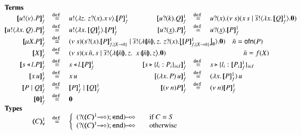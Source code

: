 \begin{figure}[h!]
\[
	\begin{array}{rclcrcl}
		\multicolumn{7}{l}{\textrm{\bf Terms}}
		\\
		\pmapp{\bout{u}{v} P}{1}{f}	&\defeq&	\bout{u}{ \abs{z}{\,\binp{z}{x} \appl{x}{v}} } \pmapp{P}{1}{f}
		& &
		\pmapp{\binp{u}{k} Q}{1}{f}	&\defeq&	\binp{u}{x} \newsp{s}{\appl{x}{s} \Par \bout{\dual{s}}{\abs{x}{\pmapp{Q}{1}{f}}} \inact}
		\\
		\pmapp{\bout{u}{\abs{x}{Q}} P}{1}{f} &\defeq& \bout{u}{\abs{x}{\pmapp{Q}{1}{f}}} \pmapp{P}{1}{f}
		& &
		\pmapp{\binp{u}{\underline{x}} P}{1}{f}	&\defeq&	\binp{u}{\underline{x}} \pmapp{P}{1}{f}
		\\
		\pmapp{\recp{X}{P}}{1}{f} &\defeq&
		\multicolumn{5}{l}{
			\newsp{s}{\binp{s}{x} \pmapp{P}{1}{{f,\{\varp{X}\to \tilde{n}\}}} \Par
			\bout{\dual{s}}{\abs{\vmap{\tilde{n}}, z } \,{\binp{z}{x} \auxmap{\pmapp{P}{1}{{f,\{\varp{X}\to \tilde{n}\}}}}{\es}}} \inact}
			\quad \tilde{n} = \ofn{P}
		}
		\\
		\pmapp{\varp{X}}{1}{f} &\defeq&
		\multicolumn{5}{l}{
			\newsp{s}{\appl{x}{\tilde{n}, s} \Par \bbout{\dual{s}}{ \abs{\vmap{\tilde{n}},z}\,\,{\appl{x}{ \vmap{\tilde{n}}, z}}} \inact}
			\qquad \qquad \qquad \qquad \qquad \quad \tilde{n} = f(\varp{X})
		}
		\\
		\pmapp{\bsel{s}{l} P}{1}{f}	&\defeq&	\bsel{s}{l} \pmapp{P}{1}{f}
		& & 
		\pmapp{\bbra{s}{l_i: P_i}_{i \in I}}{1}{f} &\defeq& \bbra{s}{l_i: \pmapp{P_i}{1}{f}}_{i \in I}
		\\
		\pmapp{\appl{x}{u}}{1}{f}	&\defeq&	\appl{x}{u}
		& &
		\pmapp{(\appl{\abs{x}{P})}{u}}{1}{f}	&\defeq&	\appl{(\abs{x}{\pmapp{P}{1}{f}})}{u}
		\\
		\pmapp{P \Par Q}{1}{f}		&\defeq&	\pmapp{P}{1}{f} \Par \pmapp{Q}{1}{f}
		& &
		\pmapp{\news{n} P}{1}{f}	&\defeq&	\news{n} \pmapp{P}{1}{f}
		\\
		\pmapp{\inact}{1}{f}		&\defeq&	\inact
		\\
		\multicolumn{7}{l}{\textrm{\bf Types}}
		\\
		\tmap{C}{1}_\mathsf{v}		&\defeq&
		\multicolumn{5}{l}{
			\left\{
			\begin{array}{rcl}
				\lhot{(\btinp{\lhot{\tmap{C}{1}}} \tinact)} && \textrm{if } C = S\\
				\lhot{(\btinp{\shot{\tmap{C}{1}}} \tinact)} && \textrm{otherwise}\\
			\end{array}
			\right.
		}
		\\

\end{array}\]
\end{figure}
